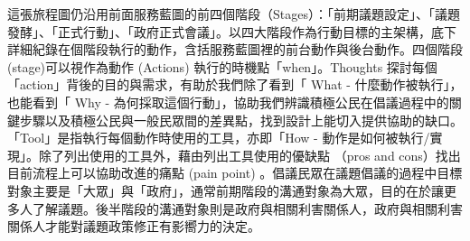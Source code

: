 \documentclass[12pt,a4paper]{article}
\begin{document}
這張旅程圖仍沿用前面服務藍圖的前四個階段（Stages）：「前期議題設定」、「議題發酵」、「正式行動」、「政府正式會議」。以四大階段作為行動目標的主架構，底下詳細紀錄在個階段執行的動作，含括服務藍圖裡的前台動作與後台動作。四個階段 (stage)可以視作為動作 (Actions) 執行的時機點「when」。Thoughts 探討每個「action」背後的目的與需求，有助於我們除了看到「 What - 什麼動作被執行」，也能看到「 Why - 為何採取這個行動」，協助我們辨識積極公民在倡議過程中的關鍵步驟以及積極公民與一般民眾間的差異點，找到設計上能切入提供協助的缺口。「Tool」是指執行每個動作時使用的工具，亦即「How - 動作是如何被執行/實現」。除了列出使用的工具外，藉由列出工具使用的優缺點 （pros and cons）找出目前流程上可以協助改進的痛點 (pain point) 。倡議民眾在議題倡議的過程中目標對象主要是「大眾」與「政府」，通常前期階段的溝通對象為大眾，目的在於讓更多人了解議題。後半階段的溝通對象則是政府與相關利害關係人，政府與相關利害關係人才能對議題政策修正有影嚮力的決定。
\end{document}
